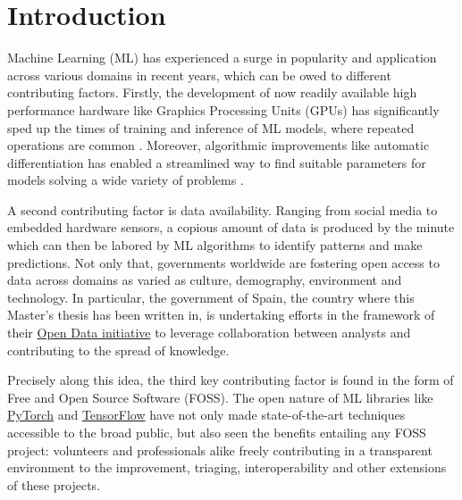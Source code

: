 \documentclass[12pt]{report} %
\begin{document}
\newpage %
\thispagestyle{empty}
\mbox{}


\clearpage
{} %

\chapter{Introduction}

Machine Learning (ML) has experienced a surge in popularity and application across various
domains in recent years, which can be owed to different contributing factors.
Firstly, the development of now readily available high performance hardware like
Graphics Processing Units (GPUs) has significantly sped up the times of training
and inference of ML models, where
repeated operations are common \cite{oh2004gpu}.
Moreover, algorithmic improvements like automatic differentiation has enabled a streamlined
way to find suitable parameters for models solving a wide variety of problems
\cite{baydin2018automatic}.

A second contributing factor is data availability. Ranging from social media to embedded hardware sensors, a copious amount of data is produced by the minute which can then be labored by ML algorithms to identify patterns and
make predictions. Not only that, governments worldwide are fostering open access to
data across domains as varied as culture, demography, environment and technology.
In particular, the government of Spain, the country where this Master's thesis has been
written in, is undertaking efforts in the framework of their
\href{https://datos.gob.es/en}{Open Data initiative} to leverage collaboration between
analysts and contributing to the spread of knowledge.

Precisely along this idea, the third key contributing factor is found in the form
of Free and Open Source Software (FOSS). The open nature of ML libraries like
\href{https://pytorch.org/}{PyTorch} and \href{https://www.tensorflow.org/}{TensorFlow}
have not only made state-of-the-art
techniques accessible to the broad public, but also seen the benefits entailing any FOSS
project: volunteers and professionals alike freely
contributing in a transparent environment
to the improvement, triaging, interoperability and other extensions of these projects.
\end{document}
